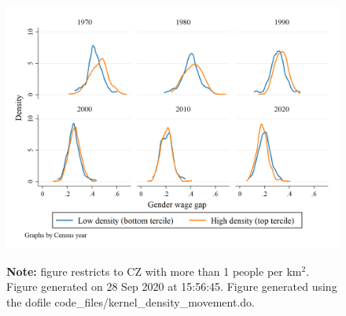 \begin{figure}[!h]
\centering
\includegraphics[width=.8\textwidth]{../2_analysis/output/figures/distribution_gap_movement_full_time}
\par \begin{minipage}[h]{\textwidth}{\scriptsize\textbf{Note:} figure restricts to CZ with more than 1 people per km$^2$. Figure generated on 28 Sep 2020 at 15:56:45. Figure generated using the dofile code\_files/kernel\_density\_movement.do.}\end{minipage}
\end{figure}
